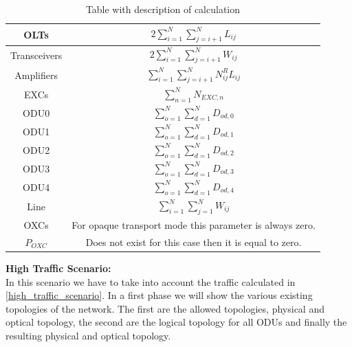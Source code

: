 \begin{table}[H]
\centering
\begin{tabular}{|| c | c ||}
 \hline
 OLTs & \(\displaystyle 2 \sum_{i=1}^{N}\sum_{j=i+1}^{N} L_{ij} \) \\ \hline
 Transceivers & \(\displaystyle 2 \sum_{i=1}^{N}\sum_{j=i+1}^{N} W_{ij} \) \\ \hline
 Amplifiers & \(\displaystyle \sum_{i=1}^{N}\sum_{j=i+1}^{N} N^R_{ij} L_{ij} \) \\ \hline
 EXCs & \(\displaystyle \sum_{n=1}^N N_{EXC,n} \) \\ \hline
 ODU0 & \(\displaystyle \sum_{o=1}^{N}\sum_{d=1}^{N} D_{od,0} \) \\ \hline
 ODU1 & \(\displaystyle \sum_{o=1}^{N}\sum_{d=1}^{N} D_{od,1} \) \\ \hline
 ODU2 & \(\displaystyle \sum_{o=1}^{N}\sum_{d=1}^{N} D_{od,2} \)\\ \hline
 ODU3 & \(\displaystyle \sum_{o=1}^{N}\sum_{d=1}^{N} D_{od,3} \) \\ \hline
 ODU4 & \(\displaystyle \sum_{o=1}^{N}\sum_{d=1}^{N} D_{od,4} \) \\ \hline
 Line & \(\displaystyle \sum_{i=1}^{N}\sum_{j=1}^{N} W_{ij} \) \\ \hline
 OXCs & For opaque transport mode this parameter is always zero. \\ \hline
 $P_{OXC}$ & Does not exist for this case then it is equal to zero. \\
 \hline
 \end{tabular}
\caption{Table with description of calculation}
\label{formulas_opaque_surv_ref_medium_heuristic}
\end{table}

\textbf{High Traffic Scenario:}\\

In this scenario we have to take into account the traffic calculated in \ref{high_traffic_scenario}. In a first phase we will show the various existing topologies of the network. The first are the allowed topologies, physical and optical topology, the second are the logical topology for all ODUs and finally the resulting physical and optical topology.\\

